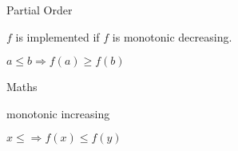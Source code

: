 \documentclass[a4paper,12pt]{article}
\begin{document}
Partial Order







$f$ is implemented if $f$ is monotonic decreasing.

$a \leq b \Rightarrow f(a) \geq f(b)$

Maths

monotonic increasing

$x \leq \Rightarrow f(x) \leq f(y)$



\end{document}
